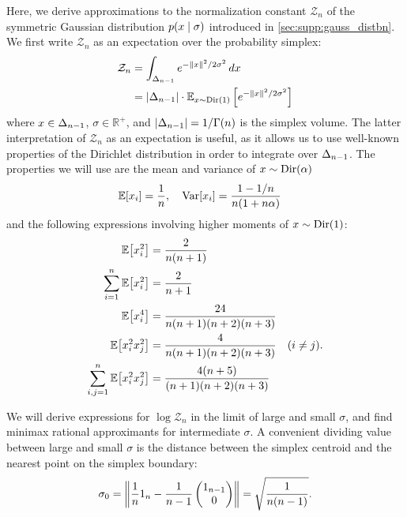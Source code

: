Here, we derive approximations to the normalization constant $\mathcal{Z}_n$ of the symmetric Gaussian distribution $p(x \mid \sigma)$ introduced in \cref{sec:supp:gauss_distbn}.
We first write $\mathcal{Z}_n$ as an expectation over the probability simplex:
\begin{align}
    \begin{split}
        \mathcal{Z}_n & = \int_{\Delta_{n-1}} e^{ -\lVert x \rVert^2 / 2 \sigma^2 } \, dx                                         \\
        & = |\Delta_{n-1}| \cdot \mathbb{E}_{x \sim \operatorname{Dir}\left\lparen1\right\rparen} \left[ e^{ -\lVert x \rVert^2 / 2 \sigma^2 } \right]
    \end{split}
\end{align}
where $x \in \Delta_{n-1}$, $\sigma \in \mathbb{R}^+$, and $|\Delta_{n-1}| = 1 / \Gamma(n)$ is the simplex volume.
The latter interpretation of $\mathcal{Z}_n$ as an expectation is useful, as it allows us to use well-known properties of the Dirichlet distribution in order to integrate over $\Delta_{n-1}$.
The properties we will use are the mean and variance of $\vv{x} \sim \Dir{\alpha}$
\begin{align}
    \Ex{\vv{x}_i} = \frac{1}{n}, \quad \Var{\vv{x}_i} & = \frac{1 - 1/n}{n (1 + n\alpha)}
\end{align}
and the following expressions involving higher moments of $\vv{x} \sim \Dir{1}$:
\begin{align}\label{eqn:supp:dirichlet_moments}
    \begin{split}
        \Ex{\vv{x}_i^2}                           & = \frac{2}{n (n+1)}                               \\
        \sum_{i=1}^n \Ex{\vv{x}_i^2}              & = \frac{2}{n+1}                                   \\
        \Ex{\vv{x}_i^4}                           & = \frac{24}{n (n+1) (n+2) (n+3)}                  \\
        \Ex{\vv{x}_i^2 \vv{x}_j^2}                & = \frac{4}{n (n+1) (n+2) (n+3)} \quad (i \neq j). \\
        \sum_{i,j=1}^n \Ex{\vv{x}_i^2 \vv{x}_j^2} & = \frac{4 (n+5)}{(n+1) (n+2) (n+3)}
    \end{split}
\end{align}

We will derive expressions for $\log\mathcal{Z}_n$ in the limit of large and small $\sigma$, and find minimax rational approximants for intermediate $\sigma$.
A convenient dividing value between large and small $\sigma$ is the distance between the simplex centroid and the nearest point on the simplex boundary:
\begin{align}
    \sigma_0 =
    \left\lVert \frac{1}{n}\mathrm{1}_{n} - \frac{1}{n-1} \begin{pmatrix} \mathrm{1}_{n-1} \\ 0 \end{pmatrix} \right\rVert
    = \sqrt{\frac{1}{n (n-1)}}.
\end{align}

